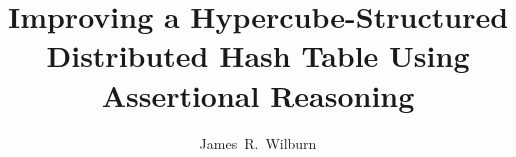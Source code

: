 \documentclass[apa6]{IEEEtran}
\begin{document}
%
\title{Improving a Hypercube-Structured Distributed Hash Table Using Assertional Reasoning}
%
%
%

\author{James~R.~Wilburn%
        }
% 
%



% 




\end{document}
